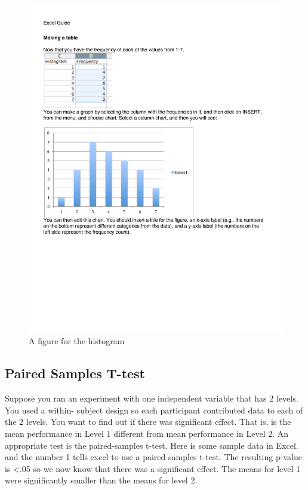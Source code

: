 \begin{figure}
      \includegraphics[width=.7\linewidth]{LabmanualFigures/Excel15.pdf}
      \caption{A figure for the histogram}
      \label{fig:excel15}
\end{figure}
 



\subsection{Paired Samples T-test} 
Suppose you ran an experiment with one independent variable that has 2 levels. You used a within- subject design so each participant contributed data to each of the 2 levels. You want to find out if there was significant effect. That is, is the mean performance in Level 1 different from mean performance in Level 2. An appropriate test is the paired-samples t-test.
Here is some sample data in Excel.
 and the number 1 tells excel to use a paired samples t-test. The resulting p-value is <.05 so we now know that there was a significant effect. The means for level 1 were significantly smaller than the means for level 2.

